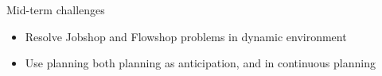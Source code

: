 \begin{frame}{Mid-term challenges}
    \begin{itemize}
        \item Resolve Jobshop and Flowshop problems in dynamic environment
        \pause
        \item Use planning both planning as anticipation, and in continuous planning
    \end{itemize}
\end{frame}